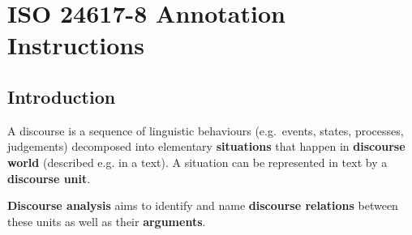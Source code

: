 \documentclass{udisc}
\begin{document}
\chapter{ISO 24617-8 Annotation Instructions}




\section{Introduction}
\label{wprowadzenie}




A discourse is a sequence of linguistic behaviours (e.g.~events, states, processes, judgements) decomposed into elementary \textbf{situations} that happen in \textbf{discourse world} (described e.g. in a text). A situation can be represented in text by a \textbf{discourse unit}.

\textbf{Discourse analysis} aims to identify and name \textbf{discourse relations} between these units as well as their \textbf{arguments}.
\end{document}
